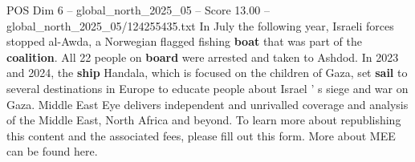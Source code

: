 \begin{textsample}{POS Dim 6 – global\_north\_2025\_05 – Score 13.00 – global\_north\_2025\_05/124255435.txt}
In July the following year, Israeli forces stopped al-Awda, a Norwegian flagged fishing \textbf{boat} that was part of the \textbf{coalition}.
All 22 people on \textbf{board} were arrested and taken to Ashdod.
In 2023 and 2024, the \textbf{ship} Handala, which is focused on the children of Gaza, set \textbf{sail} to several destinations in Europe to educate people about Israel ' s siege and war on Gaza.
Middle East Eye delivers independent and unrivalled coverage and analysis of the Middle East, North Africa and beyond.
To learn more about republishing this content and the associated fees, please fill out this form.
More about MEE can be found here.

\end{textsample}
